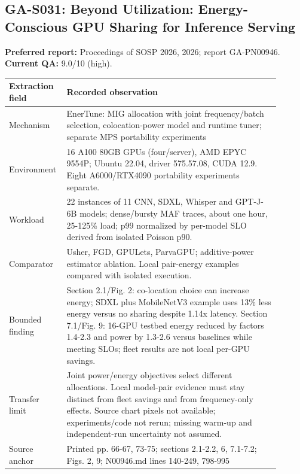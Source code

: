 \subsection{GA-S031: Beyond Utilization: Energy-Conscious GPU Sharing for Inference Serving}
\textbf{Preferred report:} Proceedings of SOSP 2026, 2026; report GA-PN00946. \textbf{Current QA:} 9.0/10 (high).
\begin{longtable}{P{0.15\linewidth}P{0.75\linewidth}}
\toprule Extraction field & Recorded observation\\\midrule\endhead
Mechanism & EnerTune: MIG allocation with joint frequency/batch selection, colocation-power model and runtime tuner; separate MPS portability experiments\\
Environment & 16 A100 80GB GPUs (four/server), AMD EPYC 9554P; Ubuntu 22.04, driver 575.57.08, CUDA 12.9. Eight A6000/RTX4090 portability experiments separate.\\
Workload & 22 instances of 11 CNN, SDXL, Whisper and GPT-J-6B models; dense/bursty MAF traces, about one hour, 25-125\% load; p99 normalized by per-model SLO derived from isolated Poisson p90.\\
Comparator & Usher, FGD, GPULets, ParvaGPU; additive-power estimator ablation. Local pair-energy examples compared with isolated execution.\\
Bounded finding & Section 2.1/Fig. 2: co-location choice can increase energy; SDXL plus MobileNetV3 example uses 13\% less energy versus no sharing despite 1.14x latency. Section 7.1/Fig. 9: 16-GPU testbed energy reduced by factors 1.4-2.3 and power by 1.3-2.6 versus baselines while meeting SLOs; fleet results are not local per-GPU savings.\\
Transfer limit & Joint power/energy objectives select different allocations. Local model-pair evidence must stay distinct from fleet savings and from frequency-only effects. Source chart pixels not available; experiments/code not rerun; missing warm-up and independent-run uncertainty not assumed.\\
Source anchor & Printed pp. 66-67, 73-75; sections 2.1-2.2, 6, 7.1-7.2; Figs. 2, 9; N00946.md lines 140-249, 798-995\\
\bottomrule\end{longtable}
